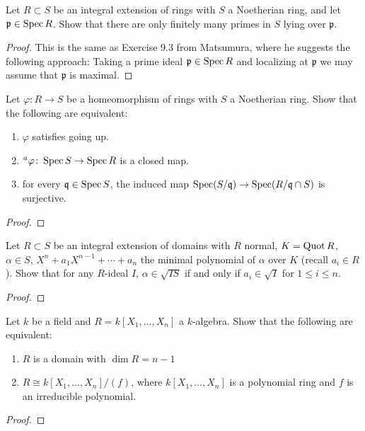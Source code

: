 \newpage
\begin{problem}
Let $R\subset S$ be an integral extension of rings with $S$ a Noetherian
ring, and let $\mathfrak{p}\in\operatorname{Spec} R$. Show that there are only finitely
many primes in $S$ lying over $\mathfrak{p}$.
\end{problem}
\begin{proof}
This is the same as Exercise 9.3 from Matsumura, where he
suggests the following approach: Taking a prime ideal
$\mathfrak{p}\in\operatorname{Spec} R$ and localizing at $\mathfrak{p}$ we may
assume that $\mathfrak{p}$ is maximal.
\end{proof}
\newpage
\begin{problem}
Let $\varphi\colon R\to S$ be a homeomorphism of rings with $S$ a
Noetherian ring. Show that the following are equivalent:
\begin{enumerate}[label=(\roman*)]
\item $\varphi$ satisfies going up.
\item $\prescript{a}{}\varphi\colon\operatorname{Spec} S\to\operatorname{Spec} R$ is a closed map.
\item for every $\mathfrak{q}\in\operatorname{Spec} S$, the induced map
  $\operatorname{Spec}(S/\mathfrak{q})\to\operatorname{Spec}(R/\mathfrak{q}\cap S)$ is surjective.
\end{enumerate}
\end{problem}
\begin{proof}
\end{proof}
\newpage
\begin{problem}
Let $R\subset S$ be an integral extension of domains with $R$ normal,
$K=\operatorname{Quot} R$,  $\alpha\in S$, $X^n+a_1X^{n-1}+\cdots+a_n$ the minimal
polynomial of $\alpha$ over $K$ (recall $a_i\in R$). Show that for any
$R$-ideal $I$, $\alpha\in \sqrt{IS}$ if and only if $a_i\in\sqrt{I}$ for
$1\leq i\leq n$.
\end{problem}
\begin{proof}
\end{proof}
\newpage
\begin{problem}
Let $k$ be a field and $R=k[X_1,...,X_n]$ a $k$-algebra. Show that the
following are equivalent:
\begin{enumerate}[label=(\roman*)]
\item $R$ is a domain with $\dim R=n-1$
\item $R\cong k[X_1,...,X_n]/(f)$, where $k[X_1,...,X_n]$ is a polynomial
  ring and $f$ is an irreducible polynomial.
\end{enumerate}
\end{problem}
\begin{proof}
\end{proof}

